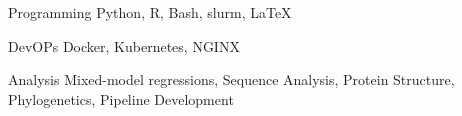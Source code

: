 

\begin{cvskills}

  \cvskill
    {Programming}
	{Python, R, Bash, slurm, LaTeX}

  \cvskill
    {DevOPs}
	{Docker, Kubernetes, NGINX}

  \cvskill
    {Analysis}
	{Mixed-model regressions, Sequence Analysis, Protein Structure, Phylogenetics, Pipeline Development}
	
\end{cvskills}